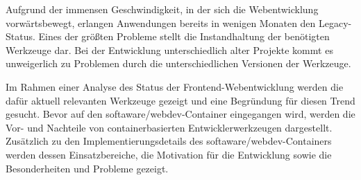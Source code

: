 Aufgrund der immensen Geschwindigkeit, in der sich die Webentwicklung vorwärtsbewegt, erlangen Anwendungen bereits in wenigen Monaten den Legacy-Status.
Eines der größten Probleme stellt die Instandhaltung der benötigten Werkzeuge dar.
Bei der Entwicklung unterschiedlich alter Projekte kommt es unweigerlich zu Problemen durch die unterschiedlichen Versionen der Werkzeuge.

Im Rahmen einer Analyse des Status der Frontend-Webentwicklung werden die dafür aktuell relevanten Werkzeuge gezeigt und eine Begründung für diesen Trend gesucht.
Bevor auf den softaware/webdev-Container eingegangen wird, werden die Vor- und Nachteile von containerbasierten Entwicklerwerkzeugen dargestellt.
Zusätzlich zu den Implementierungsdetails des softaware/webdev-Containers werden dessen Einsatzbereiche, die Motivation für die Entwicklung sowie die Besonderheiten und Probleme gezeigt.

